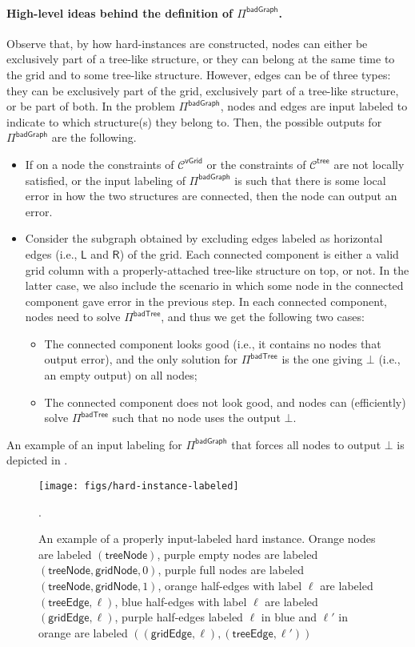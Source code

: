 \documentclass[11pt]{article}
\newcommand{\lleft}{\mathsf {L}}
\newcommand{\lright}{\mathsf {R}}
\newcommand{\lgridedge}{\mathsf {gridEdge}}
\newcommand{\lgridnode}{\mathsf {gridNode}}
\newcommand{\ltreenode}{\mathsf {treeNode}}
\newcommand{\ltreeedge}{\mathsf {treeEdge}}
\newcommand{\lvgrid}{\mathsf {vGrid}}
\newcommand{\ltreelike}{\mathsf {tree}}
\newcommand{\lbadtree}{\mathsf {badTree}}
\newcommand{\lbadgraph}{\mathsf {badGraph}}
\begin{document}
\paragraph{\boldmath High-level ideas behind the definition of $\Pi^{\lbadgraph}$.}
Observe that, by how hard-instances are constructed, nodes can either be exclusively part of a tree-like structure, or they can belong at the same time to the grid and to some tree-like structure. However, edges can be of three types: they can be exclusively part of the grid, exclusively part of a tree-like structure, or be part of both. In the problem $\Pi^{\lbadgraph}$, nodes and edges are input labeled to indicate to which structure(s) they belong to. Then, the possible outputs for $\Pi^{\lbadgraph}$ are the following.
\begin{itemize}
	\item If on a node the constraints of $\mathcal{C}^{\lvgrid}$ or the constraints of $\mathcal{C}^{\ltreelike}$ are not locally satisfied, or the input labeling of $\Pi^{\lbadgraph}$ is such that there is some local error in how the two structures are connected, then the node can output an error.
	\item Consider the subgraph obtained by excluding edges labeled as horizontal edges (i.e., $\lleft$ and $\lright$) of the grid. Each connected component is either a valid grid column with a properly-attached tree-like structure on top, or not. In the latter case, we also include the scenario in which some node in the connected component gave error in the previous step. In each connected component, nodes need to solve $\Pi^\lbadtree$, and thus we get the following two cases:
	\begin{itemize}
		\item The connected component looks good (i.e., it contains no nodes that output error), and the only solution for $\Pi^\lbadtree$ is the one giving $\bot$ (i.e., an empty output) on all nodes;
		\item The connected component does not look good, and nodes can (efficiently) solve $\Pi^\lbadtree$ such that no node uses the output $\bot$.
	\end{itemize}
\end{itemize}
An example of an input labeling for $\Pi^{\lbadgraph}$ that forces all nodes to output $\bot$ is depicted in .

\begin{figure}[t]
	\centering
	\texttt{[image: figs/hard-instance-labeled]}
	\caption{An example of a properly input-labeled hard instance. Orange nodes are labeled $(\ltreenode)$, purple empty nodes are labeled $(\ltreenode,\lgridnode,0)$, purple full nodes are labeled $(\ltreenode,\lgridnode,1)$, orange half-edges with label $\ell$ are labeled $(\ltreeedge,\ell)$, blue half-edges with label $\ell$ are labeled $(\lgridedge,\ell)$, purple half-edges labeled $\ell$ in blue and $\ell'$ in orange are labeled $((\lgridedge,\ell),(\ltreeedge,\ell'))$}.
	\label{fig:hard-instance-labeled}
\end{figure}
\end{document}
